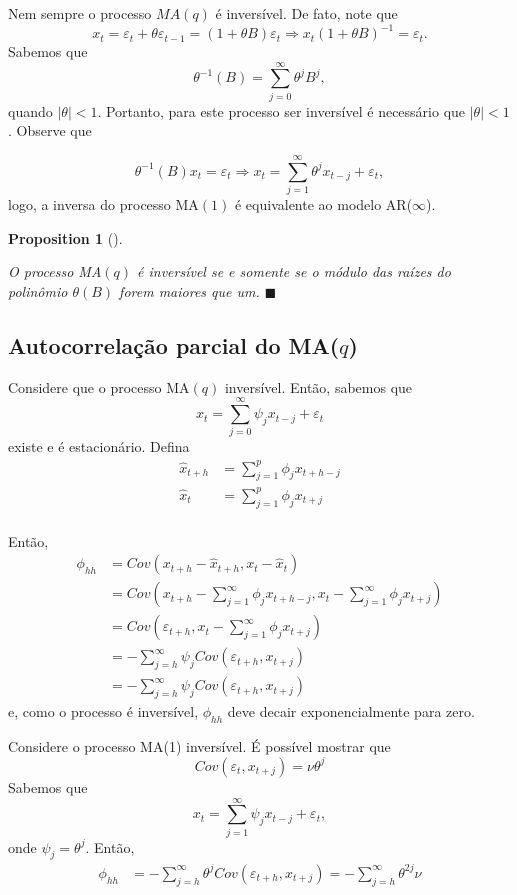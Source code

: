 \documentclass[
  letterpaper,
  DIV=11,
  numbers=noendperiod]{scrartcl}
\theoremstyle{definition}
\theoremstyle{definition}
\theoremstyle{plain}
\newtheorem{proposition}{Proposition}[chapter]
\theoremstyle{plain}
\theoremstyle{remark}
\begin{document}
Nem sempre o processo \(MA(q)\) é inversível. De fato, note que
\[x_t=\varepsilon_t +\theta\varepsilon_{t-1}=(1+\theta B)\varepsilon_t\Rightarrow x_t(1+\theta B)^{-1}=\varepsilon_t.\]
Sabemos que \[\theta^{-1}(B)=\sum_{j=0}^{\infty}\theta^j B^j,\] quando
\(|\theta|<1\). Portanto, para este processo ser inversível é necessário
que \(|\theta|<1\). Observe que

\[\theta^{-1}(B)x_t=\varepsilon_t\Rightarrow x_t=\sum_{j=1}^\infty \theta^j x_{t-j}+\varepsilon_t,\]
logo, a inversa do processo MA\((1)\) é equivalente ao modelo
AR(\(\infty\)).

\begin{proposition}[]\protect\hypertarget{prp-}{}\label{prp-}

O processo MA\((q)\) é inversível se e somente se o módulo das raízes do
polinômio \(\theta(B)\) forem maiores que um. \(\blacksquare\)

\end{proposition}

\subsection{\texorpdfstring{Autocorrelação parcial do
MA(\(q\))}{Autocorrelação parcial do MA(q)}}\label{autocorrelauxe7uxe3o-parcial-do-maq}

Considere que o processo MA\((q)\) inversível. Então, sabemos que
\[x_t=\sum_{j=0}^\infty\psi_j x_{t-j}+\varepsilon_t \] existe e é
estacionário. Defina \begin{align}
\hat{x}_{t+h}&=\sum_{j=1}^p\phi_j x_{t+h-j}\\
\hat{x}_{t}&=\sum_{j=1}^p\phi_j x_{t+j}\\
\end{align}

Então,
\begin{align}\phi_{hh}&=Cov(x_{t+h}-\hat{x}_{t+h},x_t-\hat{x}_t)\\
&=Cov\left(x_{t+h}-\sum_{j=1}^\infty\phi_j x_{t+h-j},x_t- \sum_{j=1}^\infty\phi_j x_{t+j}\right)\\&=Cov\left(\varepsilon_{t+h},x_t- \sum_{j=1}^\infty\phi_j x_{t+j}\right)\\&=-\sum_{j=h}^\infty\psi_jCov(\varepsilon_{t+h},x_{t+j})\\&=-\sum_{j=h}^\infty\psi_jCov(\varepsilon_{t+h},x_{t+j})\end{align}
e, como o processo é inversível, \(\phi_{hh}\) deve decair
exponencialmente para zero.

\protect{}\label{exm}
Considere o processo MA(1) inversível. É possível mostrar que
\[Cov(\varepsilon_t,x_{t+j})=\nu\theta^j\] Sabemos que
\[x_t=\sum_{j=1}^\infty \psi_jx_{t-j}+\varepsilon_t,\] onde
\(\psi_j=\theta^j\). Então,
\begin{align}\phi_{hh}&=-\sum_{j=h}^\infty\theta^j Cov(\varepsilon_{t+h},x_{t+j})=-\sum_{j=h}^\infty\theta^{2j} \nu\end{align}
\end{document}
